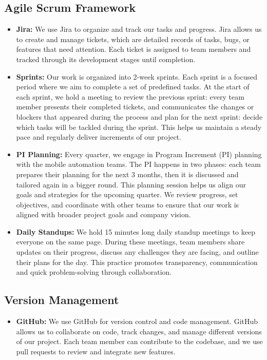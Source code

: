 \subsection{Agile Scrum Framework} 
\begin{itemize}
    \item \textbf{Jira: } We use Jira to organize and track our tasks and progress. Jira allows us to create 
    and manage tickets, which are detailed records of tasks, bugs, or features that need attention. 
    Each ticket is assigned to team members and tracked through its development stages until completion.

    \item \textbf{Sprints: } Our work is organized into 2-week sprints. Each sprint is a focused period 
    where we aim to complete a set of predefined tasks. At the start of each sprint, we hold a meeting to 
    review the previous sprint: every team member presents their completed tickets, and communicates the 
    changes or blockers that appeared during the process and plan for the next sprint: decide which tasks 
    will be tackled during the sprint. 
    This helps us maintain a steady pace and regularly deliver increments of our project.

    \item  \textbf{PI Planning: } Every quarter, we engage in Program Increment (PI) planning with the 
    mobile automation teams. The PI happens in two phases: each team prepares their planning for the next 3
    months, then it is discussed and tailored again in a bigger round. This planning session helps us align 
    our goals and strategies for the upcoming quarter. We review progress, set objectives, and coordinate 
    with other teams to ensure that our work is aligned with broader project goals and company vision.

    \item \textbf{Daily Standups: } We hold 15 minutes long daily standup meetings to keep everyone on the 
    same page. During these meetings, team members share updates on their progress, discuss any challenges 
    they are facing, and outline their plans for the day. This practice promotes transparency, communication and quick 
    problem-solving through collaboration.

\end{itemize}

\subsection{Version Management}
\begin{itemize}
    \item \textbf{GitHub: } We use GitHub for version control and code management. GitHub allows us to 
    collaborate on code, track changes, and manage different versions of our project. Each team member 
    can contribute to the codebase, and we use pull requests to review and integrate new features.
\end{itemize}

